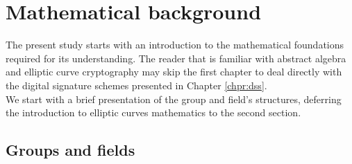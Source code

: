 \chapter{Mathematical background}
\label{chpr:math}
The present study starts with an introduction to the mathematical foundations required for its understanding. The reader that is familiar with abstract algebra and elliptic curve cryptography may skip the first chapter to deal directly with the digital signature schemes presented in Chapter \ref{chpr:dss}.
\\
We start with a brief presentation of the group and field's structures, deferring the introduction to elliptic curves mathematics to the second section.

\bigskip

\section{Groups and fields}
\label{groupsfields}

